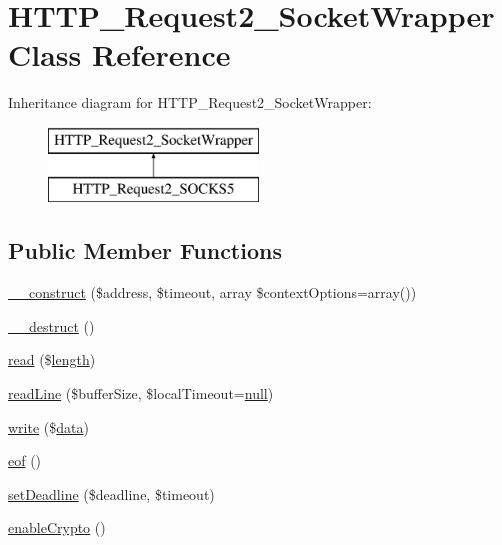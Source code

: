 \hypertarget{classHTTP__Request2__SocketWrapper}{}\section{H\+T\+T\+P\+\_\+\+Request2\+\_\+\+Socket\+Wrapper Class Reference}
\label{classHTTP__Request2__SocketWrapper}
Inheritance diagram for H\+T\+T\+P\+\_\+\+Request2\+\_\+\+Socket\+Wrapper\+:\begin{figure}[H]
\begin{center}
\leavevmode
\includegraphics[height=2.000000cm]{classHTTP__Request2__SocketWrapper}
\end{center}
\end{figure}
\subsection*{Public Member Functions}
\begin{DoxyCompactItemize}
\item 
\hyperlink{classHTTP__Request2__SocketWrapper_a3a59e9400c03f4f9aa6b2c2659f22512}{\+\_\+\+\_\+construct} (\$address, \$timeout, array \$context\+Options=array())
\item 
\hyperlink{classHTTP__Request2__SocketWrapper_af5176bcee9170ae7d4d9c00aadbfcde3}{\+\_\+\+\_\+destruct} ()
\item 
\hyperlink{classHTTP__Request2__SocketWrapper_a5e483244689fefacb4b774fde087c60d}{read} (\$\hyperlink{xpresseditor_8min_8js_a8251a40bc2803d85bf8a918f1f288cce}{length})
\item 
\hyperlink{classHTTP__Request2__SocketWrapper_a7b6d59527741b687f3de869bdd6bb1bf}{read\+Line} (\$buffer\+Size, \$local\+Timeout=\hyperlink{modernizr_8min_8js_a286f9ec831c5e676eeb493248eab9575}{null})
\item 
\hyperlink{classHTTP__Request2__SocketWrapper_ac0c9f5044043c4e55efe5f1d71ac63a1}{write} (\$\hyperlink{document__category_8js_a94b4f25375ac17cb917012e05bf514a7}{data})
\item 
\hyperlink{classHTTP__Request2__SocketWrapper_a25df9e4044072eabf76add57013b205e}{eof} ()
\item 
\hyperlink{classHTTP__Request2__SocketWrapper_a5bb5243d3cde9ec3eadcdbed1a3ffba4}{set\+Deadline} (\$deadline, \$timeout)
\item 
\hyperlink{classHTTP__Request2__SocketWrapper_a541cea424faf35b039273eb4c5a8472a}{enable\+Crypto} ()
\end{DoxyCompactItemize}
